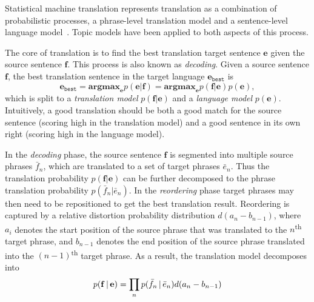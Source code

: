 Statistical machine translation represents translation as a
combination of probabilistic processes, a phrase-level translation model and a sentence-level language model~\citep{koehn-03,koehn-09}. 
Topic models have been applied to both aspects of this process.

The core of translation is to find the best translation target sentence $\mathbf{e}$ 
given the source sentence $\mathbf{f}$.
This process is also known as \textit{decoding}.
Given a source sentence $\mathbf{f}$, the best
translation sentence in the target language $\mathbf{e}_\texttt{best}$ is
\begin{equation}
\mathbf{e}_\texttt{best} = \textbf{argmax}_\mathbf{e} p(\mathbf{e}|\mathbf{f}) = \textbf{argmax}_\mathbf{e} p(\mathbf{f}|\mathbf{e}) p (\mathbf{e}),
\end{equation}
which is split to a \textit{translation model}
$p(\mathbf{f}|\mathbf{e})$ and a \textit{language model} $p
(\mathbf{e})$.
Intuitively, a good translation should be both a good match for the source sentence (scoring high in the translation model) 
and a good sentence in its own right (scoring high in the language model).

In the \textit{decoding} phase, the source sentence $\mathbf{f}$ is segmented into multiple source
phrases $\bar{f}_n$, which are translated to a set
of target phrases $\bar{e}_n$. Thus the translation probability
$p(\mathbf{f}|\mathbf{e})$ can be further decomposed to the phrase
translation probability $p(\bar{f}_n | \bar{e}_n)$.
In the \textit{reordering} phase target phrases may then need to be repositioned to get the best
translation result. Reordering is captured by a relative distortion
probability distribution $d(a_n - b_{n-1})$, where $a_i$ denotes the
start position of the source phrase that was translated to the $n$\textsuperscript{th}
target phrase, and $b_{n-1}$ denotes the end position of the source
phrase translated into the $(n-1)$\textsuperscript{th} target phrase. As a result, the
translation model decomposes into
\begin{equation}
p(\mathbf{f} \, | \, \mathbf{e}) = \prod_{n} p(\bar{f}_n \, | \, \bar{e}_n) d(a_n - b_{n-1})
\end{equation}

